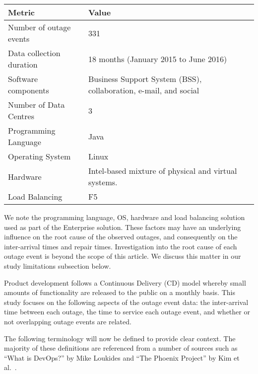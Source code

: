 \documentclass[5p]{elsarticle}
\begin{document}
\begin {table*}[]
\caption {Summary of dataset metrics} 
\begin{center}
\begin{tabular}{p{4cm} |  p{11cm}} \hline \bf{Metric} & \bf{Value}
\\ \hline Number of outage events & 331 
\\ Data collection duration & 18 months (January 2015 to June 2016) 
\\ Software components & Business Support System (BSS), collaboration, e-mail, and social  	
\\ Number of Data Centres & 3 
\\ Programming Language & Java 
\\ Operating System & Linux 
\\ Hardware & Intel-based mixture of physical and virtual systems.
\\ Load Balancing & F5
\\ \hline
\end{tabular}
\end{center}
\end{table*}

We note the programming language, OS, hardware and load balancing solution used as part of the Enterprise solution. These factors may have an underlying influence on the root cause of the observed outages, and consequently on the inter-arrival times and repair times. Investigation into the root cause of each outage event is beyond the scope of this article. We discuss this matter in our study limitations subsection below.

Product development follows a Continuous Delivery (CD) model whereby small amounts of functionality are released to the public on a monthly basis. This study focuses on the following aspects of the outage event data: the inter-arrival time between each outage, the time to service each outage event, and whether or not overlapping outage events are related.

The following terminology will now be defined to provide clear context. The majority of these definitions are referenced from a number of sources such as ``What is DevOps?'' by Mike Loukides \cite{loukides2012devops} and ``The Phoenix Project'' by Kim et al.~\cite{kim2014phoenix}.
\end{document}
